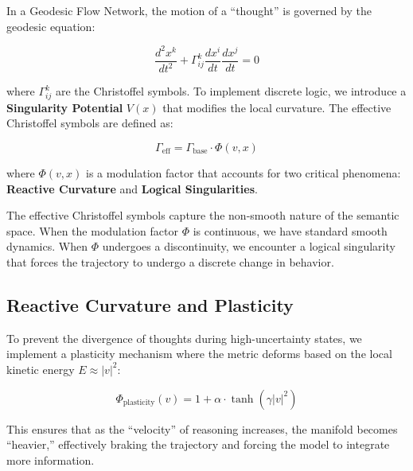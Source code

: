\documentclass[12pt,a4paper]{article}
\begin{document}
In a Geodesic Flow Network, the motion of a ``thought'' is governed by the geodesic equation:

\begin{equation}
\frac{d^2 x^k}{dt^2} + \Gamma^k_{ij} \frac{dx^i}{dt} \frac{dx^j}{dt} = 0
\end{equation}

where $\Gamma^k_{ij}$ are the Christoffel symbols. To implement discrete logic, we introduce a \textbf{Singularity Potential} $V(x)$ that modifies the local curvature. The effective Christoffel symbols are defined as:

\begin{equation}
\Gamma_{\text{eff}} = \Gamma_{\text{base}} \cdot \Phi(v, x)
\end{equation}

where $\Phi(v, x)$ is a modulation factor that accounts for two critical phenomena: \textbf{Reactive Curvature} and \textbf{Logical Singularities}.

The effective Christoffel symbols capture the non-smooth nature of the semantic space. When the modulation factor $\Phi$ is continuous, we have standard smooth dynamics. When $\Phi$ undergoes a discontinuity, we encounter a logical singularity that forces the trajectory to undergo a discrete change in behavior.

\subsection{Reactive Curvature and Plasticity}

To prevent the divergence of thoughts during high-uncertainty states, we implement a plasticity mechanism where the metric deforms based on the local kinetic energy $E \approx |v|^2$:

\begin{equation}
\Phi_{\text{plasticity}}(v) = 1 + \alpha \cdot \tanh(\gamma |v|^2)
\end{equation}

This ensures that as the ``velocity'' of reasoning increases, the manifold becomes ``heavier,'' effectively braking the trajectory and forcing the model to integrate more information.
\end{document}
